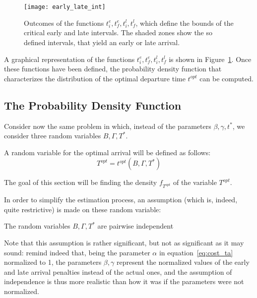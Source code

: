 \begin{figure}
  \centering
  \texttt{[image: early\_late\_int]}
  \caption{Outcomes of the functions \(t_i^e, t_f^e, t_i^l, t_f^l\),
    which define the bounds of the critical early and late intervals.
    The shaded zones show the so defined intervals,
  that yield an early or late arrival.}
  \label{fig:early-late-int}
\end{figure}

A graphical representation of the functions \(t_i^e, t_f^e, t_i^l, t_f^l\) is shown in Figure~\ref{fig:early-late-int}.
Once these functions have been defined,
the probability density function that characterizes the distribution of the optimal departure time \(t^{opt}\) can be computed.

\subsection{The Probability Density Function}

Consider now the same problem in which,
instead of the parameters \(\beta, \gamma, t^*\),
we consider three random variables \(B, \Gamma, T^*\).

A random variable for the optimal arrival will be defined as follows:
\begin{equation}
  \label{eq:rv-opt-arr}
  T^{opt} = t^{opt}(B, \Gamma, T^*)
\end{equation}

The goal of this section will be finding the density \(f_{T^{opt}}\) of the variable \(T^{opt}\).

In order to simplify the estimation process, an assumption (which is, indeed, quite restrictive)
is made on these random variable:

\begin{assumption}
  The random variables \(B, \Gamma, T^*\) are pairwise independent
\end{assumption}

Note that this assumption is rather significant,
but not as significant as it may sound:
remind indeed that, being the parameter \(\alpha\) in equation~\eqref{eq:cost_ta} normalized to 1,
the parameters \(\beta, \gamma\) represent the normalized values of the early and late arrival penalties instead of the actual ones,
and the assumption of independence is thus more realistic than how it was if the parameters were not normalized.

